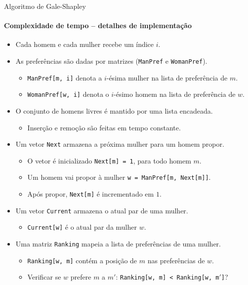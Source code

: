 \begin{frame}{Algoritmo de Gale-Shapley}
\framesubtitle{Complexidade de tempo -- detalhes de implementação}

\begin{itemize}
	\item Cada homem e cada mulher recebe um índice $i$.
	\item As preferências são dadas por matrizes (\texttt{ManPref} e \texttt{WomanPref}).
	\begin{itemize}
		\item \texttt{ManPref[m,\,i]} denota a $i$-ésima mulher na lista de preferência de $m$.
		\item \texttt{WomanPref[w,\,i]} denota o $i$-ésimo homem na lista de preferência de $w$.
	\end{itemize}

	\smallskip
	\pause
	\item O conjunto de homens livres é mantido por uma lista encadeada.
	\begin{itemize}
		\item Inserção e remoção são feitas em tempo constante.
	\end{itemize}
	
	\smallskip
	\pause
	\item Um vetor \texttt{Next} armazena a próxima mulher para um homem propor.
	\begin{itemize}
		\item O vetor é inicializado \texttt{Next[m] = 1}, para todo homem $m$.
		\item Um homem vai propor à mulher \texttt{w = ManPref[m,\,Next[m]]}.
		\item Após propor, \texttt{Next[m]} é incrementado em $1$.
	\end{itemize}
	
	\smallskip
	\pause
	\item Um vetor \texttt{Current} armazena o atual par de uma mulher.
	\begin{itemize}
		\item \texttt{Current[w]} é o atual par da mulher $w$.
	\end{itemize}
	
	\smallskip
	\pause
	\item Uma matriz \texttt{Ranking} mapeia a lista de preferências de uma mulher.
	\begin{itemize}
		\item \texttt{Ranking[w,\,m]} contém a posição de $m$ nas preferências de $w$.
		\item Verificar se $w$ prefere $m$ a $m'$: \texttt{Ranking[w,\,m] < Ranking[w,\,m$'$]}?
	\end{itemize}
\end{itemize}



\end{frame}
